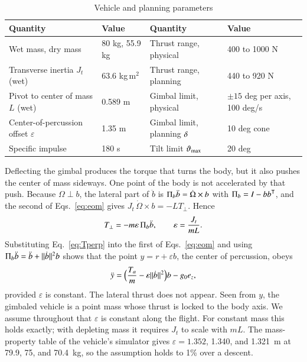\begin{table}[t]\centering
\caption{Vehicle and planning parameters}\label{tab:vehicle}
\small
\begin{tabular}{@{}llll@{}}\toprule
Quantity & Value & Quantity & Value \\\midrule
Wet mass, dry mass & 80 kg, 55.9 kg & Thrust range, physical & 400 to 1000 N \\
Transverse inertia $J_t$ (wet) & 63.6 kg\,m$^2$ & Thrust range, planning & 440 to 920 N \\
Pivot to center of mass $L$ (wet) & 0.589 m & Gimbal limit, physical & $\pm15$ deg per axis, 100 deg/s \\
Center-of-percussion offset $\varepsilon$ & 1.35 m & Gimbal limit, planning $\delta$ & 10 deg cone \\
Specific impulse & 180 s & Tilt limit $\vartheta_{\max}$ & 20 deg \\\bottomrule
\end{tabular}
\end{table}

Deflecting the gimbal produces the torque that turns the body, but it also pushes the center of mass sideways. One point of the
body is not accelerated by that push. Because $\Omega\perp b$, the lateral part of $\ddot b$ is $\Pi_b\ddot b=\dot\Omega\times b$
with $\Pi_b=I-bb^{\mathsf T}$, and the second of Eqs.~\eqref{eq:eom} gives $J_t\,\dot\Omega\times b=-LT_\perp$. Hence
\begin{equation}\label{eq:Tperp}
T_\perp=-m\varepsilon\,\Pi_b\ddot b,\qquad \varepsilon=\frac{J_t}{mL}.
\end{equation}
Substituting Eq.~\eqref{eq:Tperp} into the first of Eqs.~\eqref{eq:eom} and using $\Pi_b\ddot b=\ddot b+\lVert \dot b\rVert^2b$ shows
that the point $y=r+\varepsilon b$, the center of percussion, obeys
\begin{equation}\label{eq:cop}
\ddot y=\Bigl(\frac{T_a}{m}-\varepsilon\lVert \dot b\rVert^2\Bigr)b-g_0e_z ,
\end{equation}
provided $\varepsilon$ is constant. The lateral thrust does not appear. Seen from $y$, the gimbaled vehicle is a point mass
whose thrust is locked to the body axis. We assume throughout that $\varepsilon$ is constant along the flight. For constant mass
this holds exactly; with depleting mass it requires $J_t$ to scale with $mL$. The mass-property table of the vehicle's
simulator gives $\varepsilon=1.352$, 1.340, and 1.321~m at 79.9, 75, and 70.4~kg, so the assumption holds to 1\% over a descent.


